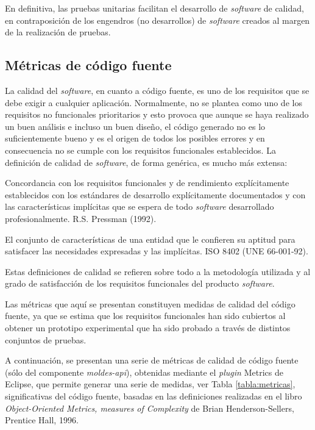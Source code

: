 En definitiva, las pruebas unitarias facilitan el desarrollo de \textit{software} de
calidad, en contraposición de los engendros (no desarrollos) de \textit{software} creados
al margen de la realización de pruebas.

\subsection{Métricas de código fuente}
La calidad del \textit{software}, en cuanto a código fuente, es uno de los requisitos que se
debe exigir a cualquier aplicación. Normalmente, no se plantea como uno de los
requisitos no funcionales prioritarios y esto provoca que aunque se haya
realizado un buen análisis e incluso un buen diseño, el código generado no es lo suficientemente bueno y es el
origen de todos los posibles errores y en consecuencia no se cumple con los
requisitos funcionales establecidos. La definición de calidad de \textit{software}, de
forma genérica, es mucho más extensa:  

\begin{definition}
Concordancia con los requisitos funcionales y de
rendimiento explícitamente establecidos con los estándares de desarrollo
explícitamente documentados y con las características implícitas
que se espera de todo \textit{software} desarrollado profesionalmente. R.S. Pressman (1992).
\end{definition}

\begin{definition}
El conjunto de características de una entidad que le confieren su
aptitud para satisfacer las necesidades expresadas y las implícitas. \gls{ISO} 8402
(\gls{UNE} 66-001-92).
\end{definition}

Estas definiciones de calidad se refieren sobre todo a la metodología utilizada y
al grado de satisfacción de los requisitos funcionales del producto \textit{software}. 

Las métricas que aquí se presentan constituyen medidas de calidad del código fuente, ya
que se estima que los requisitos funcionales han sido cubiertos al obtener un
prototipo experimental que ha sido probado a través de distintos conjuntos de pruebas.

A continuación, se presentan una serie de métricas de calidad de código fuente
(sólo del componente \textit{moldes-api}), obtenidas mediante el \textit{plugin} Metrics de Eclipse, que 
permite generar una serie de medidas, ver Tabla \ref{tabla:metricas}, significativas del código fuente, basadas en 
las definiciones realizadas en el libro \textit{Object-Oriented Metrics, measures of Complexity} de Brian Henderson-Sellers, Prentice Hall, 1996. 

